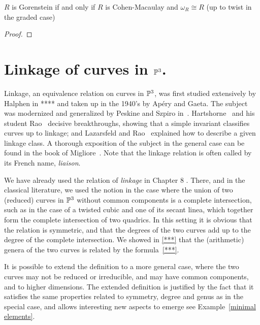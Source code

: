 \begin{theorem} \label{canonical of Gor}
 $R$ is Gorenstein if and only if $R$ is Cohen-Macaulay and $\omega_{R} \cong R$ (up to twist in the graded case)
\end{theorem}
\begin{proof}
 
\end{proof}

\section{Linkage of curves in ${\mathbb P}^3$.}

Linkage, an equivalence relation on curves in ${\mathbb P}^3$, was first studied extensively by Halphen in **** and taken up in the 1940's by Ap\'ery and Gaeta. The subject was modernized and generalized by Peskine and Szpiro in~\cite{PeskineSzpiro}. Hartshorne~\cite{} and his student
Rao~\cite{} decisive breakthroughs, showing that a simple invariant classifies curves up to linkage; and Lazarsfeld and Rao~\cite{} explained how to describe a given linkage class. A thorough exposition of the subject in the general case can be found in the book of Migliore~\cite{Mig}. Note that the linkage relation is often called by its French name, \emph{liaison}.


We have already used the relation of \emph{ linkage} in Chapter 8 . There, and in the classical literature, we used the notion in the case where the union of two (reduced) curves in ${\mathbb P}^{3}$ without common components is a complete intersection, such as in the case of  a twisted cubic and one of its secant linea, which together form the complete intersection of two quadrics. In this setting it is obvious that the relation is symmetric, and that the degrees of the two curves add up to the degree of the complete intersection. We showed in \ref{***} that the (arithmetic) genera of the two curves is related by the formula~\ref{***}. 

It is possible to extend the definition to a more general case, where the two curves may not be reduced or irreducible, and may have common components, and to higher dimensions. The extended definition is justified by the fact that it satisfies the same properties related to symmetry, degree and genus as in the special case, and allows interesting new aspects to emerge see Example~\ref{minimal elements}. 


